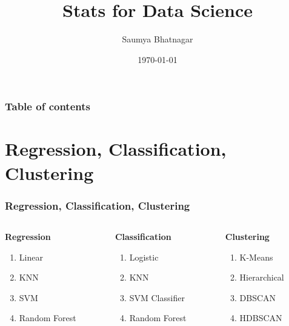 \documentclass{beamer}
\begin{document}
	\title{Stats for Data Science}  
	\author{Saumya Bhatnagar}
	\date{\today} 
	
	
\begin{frame}
\titlepage
\end{frame}

\begin{frame}\frametitle{Table of contents}\tableofcontents
\end{frame} 





\section{Regression, Classification, Clustering}
\begin{frame}\frametitle{Regression, Classification, Clustering}
\begin{columns}
	\begin{column}{0.3\textwidth}
		\textbf{Regression}
		\begin{enumerate}
			\item Linear
			\item KNN
			\item SVM
			\item Random Forest
		\end{enumerate}
	\end{column}
	\begin{column}{0.3\textwidth}
		\textbf{Classification}
		\begin{enumerate}
			\item Logistic
			\item KNN
			\item SVM Classifier
			\item Random Forest
		\end{enumerate}
	\end{column}
	\begin{column}{0.3\textwidth}
		\textbf{Clustering}
		\begin{enumerate}
			\item K-Means
			\item Hierarchical
			\item DBSCAN
			\item HDBSCAN
		\end{enumerate}
	\end{column}
\end{columns}
\end{frame}
\end{document}
